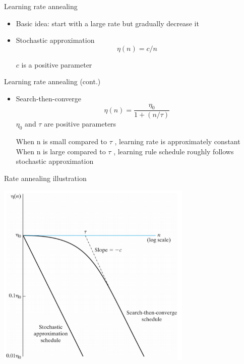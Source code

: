 \documentclass[notes]{beamer}
\begin{document}
\begin{frame}{Learning rate annealing}

\begin{itemize}
\item
  Basic idea: start with a large rate but gradually decrease it
\item
  Stochastic approximation \[\eta(n) = c/n\]

  \(c\) is a positive parameter
\end{itemize}

\end{frame}

\begin{frame}{Learning rate annealing (cont.)}

\begin{itemize}
\item
  Search-then-converge \[\eta(n) = \frac{\eta_0}{1+(n/\tau)}\]
  \(\eta_0\) and \(\tau\) are positive parameters

  When n is small compared to \(\tau\) , learning rate is approximately
  constant When n is large compared to \(\tau\) , learning rule schedule
  roughly follows stochastic approximation
\end{itemize}

\end{frame}

\begin{frame}{Rate annealing illustration}

\centering  

\includegraphics[width=0.70000\textwidth]{2018-03-10-10-18-17.png}\\

\end{frame}
\end{document}
